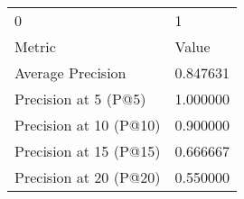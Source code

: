 \begin{tabular}{ll}
0 & 1 \\
Metric & Value \\
Average Precision & 0.847631 \\
Precision at 5 (P@5) & 1.000000 \\
Precision at 10 (P@10) & 0.900000 \\
Precision at 15 (P@15) & 0.666667 \\
Precision at 20 (P@20) & 0.550000 \\
\end{tabular}
